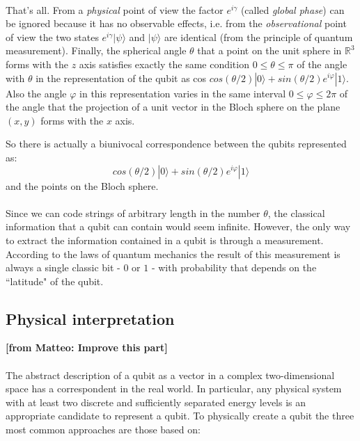 \documentclass[a4paper,10pt]{article}
\newcommand{\from}[2]{{\bf[{\sc from #1:} #2]}}
\begin{document}
\paragraph{} That's all. From a \textit{physical} point of view the factor $e^{i\gamma}$ (called \textit{global phase}) can be ignored because it has no observable effects, i.e. from the \textit{observational} point of view the two states $e^{i\gamma}|\psi\rangle$ and $|\psi\rangle$ are identical (from the principle of quantum measurement).
Finally, the spherical angle $\theta$ that a point on the unit sphere in ${\mathbb{R}}^3$ forms with the $z$ axis satisfies exactly the same condition $0 \leq \theta \leq \pi$ of the angle with $\theta$ in the representation of the qubit as cos $cos\left(\theta/2\right)|0\rangle + sin\left(\theta/2\right) e^{i\varphi}|1\rangle$. Also the angle $\varphi$ in this representation varies in the same interval $0 \leq \varphi \leq 2\pi$ of the angle that the projection of a unit vector in the Bloch sphere on the plane $(x, y)$ forms with the $x$ axis.

So there is actually a biunivocal correspondence between the qubits represented as:
$$cos\left(\theta/2\right)|0\rangle + sin\left(\theta/2\right) e^{i\varphi}|1\rangle$$
and the points on the Bloch sphere.

\paragraph{} Since we can code strings of arbitrary length in the number $\theta$, the classical information that a qubit can contain would seem infinite. However, the only way to extract the information contained in a qubit is through a measurement. According to the laws of quantum mechanics the result of this measurement is always a single classic bit - $0$ or $1$ - with probability that depends on the ``latitude" of the qubit.

\subsection{Physical interpretation}
\from{Matteo}{Improve this part}

\paragraph{} The abstract description of a qubit as a vector in a complex two-dimensional space has a correspondent in the real world. In particular, any physical system with at least two discrete and sufficiently separated energy levels is an appropriate candidate to represent a qubit. To physically create a qubit the three most common approaches are those based on:
\end{document}
